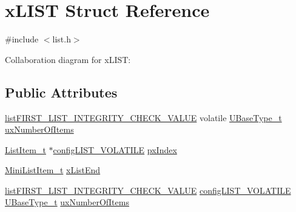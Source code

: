 \hypertarget{structx_l_i_s_t}{}\section{x\+L\+I\+ST Struct Reference}
\label{structx_l_i_s_t}


{\ttfamily \#include $<$list.\+h$>$}



Collaboration diagram for x\+L\+I\+ST\+:
\subsection*{Public Attributes}
\begin{DoxyCompactItemize}
\item 
\hyperlink{vendor_2ceedling_2plugins_2freertos_2vendor_2freertos_2include_2list_8h_a3a52b5a4f70d3a07e37a5814a23ba880}{list\+F\+I\+R\+S\+T\+\_\+\+L\+I\+S\+T\+\_\+\+I\+N\+T\+E\+G\+R\+I\+T\+Y\+\_\+\+C\+H\+E\+C\+K\+\_\+\+V\+A\+L\+UE} volatile \hyperlink{externals_2freertos_2portable_2_g_c_c_2_a_r_m___c_m0_2portmacro_8h_a646f89d4298e4f5afd522202b11cb2e6}{U\+Base\+Type\+\_\+t} \hyperlink{structx_l_i_s_t_aa5cb7cdc699e1252af0441e46e427a03}{ux\+Number\+Of\+Items}
\item 
\hyperlink{externals_2freertos_2include_2list_8h_a1a62d469392f9bfe2443e7efab9c8398}{List\+Item\+\_\+t} $\ast$\hyperlink{vendor_2ceedling_2plugins_2freertos_2vendor_2freertos_2include_2list_8h_a2d5de557c5561c8980d1bf51d87d8cba}{config\+L\+I\+S\+T\+\_\+\+V\+O\+L\+A\+T\+I\+LE} \hyperlink{structx_l_i_s_t_a79e84e9d83977d423508cb59d9629166}{px\+Index}
\item 
\hyperlink{externals_2freertos_2include_2list_8h_a542a8d55e98bc407593979e61f83cd02}{Mini\+List\+Item\+\_\+t} \hyperlink{structx_l_i_s_t_a49ad62fa153126e27e273811167b336a}{x\+List\+End}
\item 
\hyperlink{vendor_2ceedling_2plugins_2freertos_2vendor_2freertos_2include_2list_8h_a3a52b5a4f70d3a07e37a5814a23ba880}{list\+F\+I\+R\+S\+T\+\_\+\+L\+I\+S\+T\+\_\+\+I\+N\+T\+E\+G\+R\+I\+T\+Y\+\_\+\+C\+H\+E\+C\+K\+\_\+\+V\+A\+L\+UE} \hyperlink{vendor_2ceedling_2plugins_2freertos_2vendor_2freertos_2include_2list_8h_a2d5de557c5561c8980d1bf51d87d8cba}{config\+L\+I\+S\+T\+\_\+\+V\+O\+L\+A\+T\+I\+LE} \hyperlink{externals_2freertos_2portable_2_g_c_c_2_a_r_m___c_m0_2portmacro_8h_a646f89d4298e4f5afd522202b11cb2e6}{U\+Base\+Type\+\_\+t} \hyperlink{structx_l_i_s_t_aa5cb7cdc699e1252af0441e46e427a03}{ux\+Number\+Of\+Items}
\end{DoxyCompactItemize}


